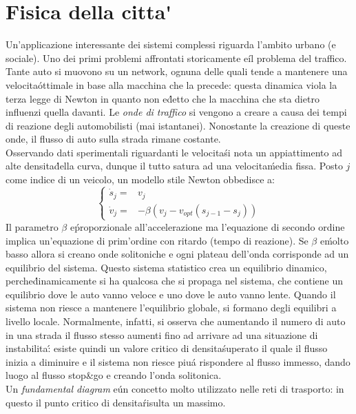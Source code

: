 \documentclass[12pt, a4paper]{book}
\theoremstyle{theorem}
\begin{document}
		\section{Fisica della citta\'}
			Un'applicazione interessante dei sistemi complessi riguarda l'ambito urbano (e sociale).
			Uno dei primi problemi affrontati storicamente e\' il problema del traffico.
			Tante auto si muovono su un network, ognuna delle quali tende a mantenere una velocita\' ottimale in base alla macchina che la precede: questa dinamica viola la terza legge di Newton in quanto non e\' detto che la macchina che sta dietro influenzi quella davanti.
			Le \emph{onde di traffico} si vengono a creare a causa dei tempi di reazione degli automobilisti (mai istantanei).
			Nonostante la creazione di queste onde, il flusso di auto sulla strada rimane costante.\\
			Osservando dati sperimentali riguardanti le velocita\' si nota un appiattimento ad alte densita\' della curva, dunque il tutto satura ad una velocita\' media fissa.
			Posto $j$ come indice di un veicolo, un modello stile Newton obbedisce a:
			\begin{equation}
				\begin{cases}
					\dot{s}_j=&v_j\\
					\dot{v}_j=&-\beta\left(v_j-v_{opt}\left(s_{j-1}-s_j\right)\right)
				\end{cases}
				\label{equation:traffic}
			\end{equation}
			Il parametro $\beta$ e\' proporzionale all'accelerazione ma l'equazione di secondo ordine implica un'equazione di prim'ordine con ritardo (tempo di reazione).
			Se $\beta$ e\' molto basso allora si creano onde solitoniche  e ogni plateau dell'onda corrisponde ad un equilibrio del sistema.
			Questo sistema statistico crea un equilibrio dinamico, perche\' dinamicamente si ha qualcosa che si propaga nel sistema, che contiene un equilibrio dove le auto vanno veloce e uno dove le auto vanno lente.
			Quando il sistema non riesce a mantenere l'equilibrio globale, si formano degli equilibri a livello locale.
			Normalmente, infatti, si osserva che aumentando il numero di auto in una strada il flusso stesso aumenti fino ad arrivare ad una situazione di instabilita\': esiste quindi un valore critico di densita\' superato il quale il flusso inizia a diminuire e il sistema non riesce piu\' a rispondere al flusso immesso, dando luogo al flusso stop\&go e creando l'onda solitonica.\\
			Un \emph{fundamental diagram} e\' un concetto molto utilizzato nelle reti di trasporto: in questo il punto critico di densita\' risulta un massimo.
\end{document}
